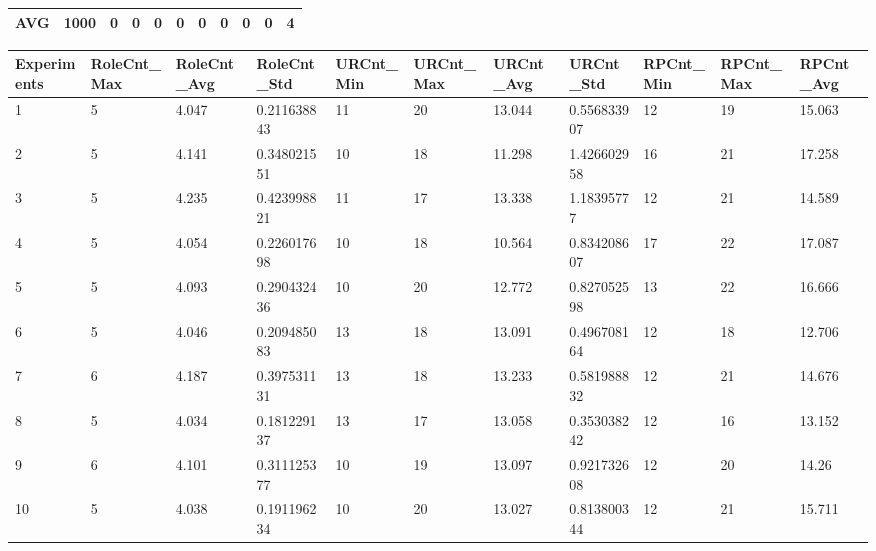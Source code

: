 \begin{table}[H]
\begin{adjustbox}{max width=380pt,keepaspectratio,angle=90}
\begin{tabular}{|l|l|l|l|l|l|l|l|l|l|l|}
					AVG         & 1000  & 0         & 0         & 0         & 0         & 0         & 0         & 0         & 0         & 4            \\ \hline
				\end{tabular}
			\end{adjustbox}
			\begin{adjustbox}{max width=380pt,keepaspectratio,angle=90}
				\begin{tabular}{|l|l|l|l|l|l|l|l|l|l|l|}
					\hline
					\rowcolor[HTML]{EFEFEF} 
					Experiments & RoleCnt\_Max & RoleCnt\_Avg & RoleCnt\_Std & URCnt\_Min & URCnt\_Max & URCnt\_Avg & URCnt\_Std  & RPCnt\_Min & RPCnt\_Max & RPCnt\_Avg \\ \hline
					1           & 5            & 4.047        & 0.211638843  & 11         & 20         & 13.044     & 0.556833907 & 12         & 19         & 15.063     \\ \hline
					2           & 5            & 4.141        & 0.348021551  & 10         & 18         & 11.298     & 1.426602958 & 16         & 21         & 17.258     \\ \hline
					3           & 5            & 4.235        & 0.423998821  & 11         & 17         & 13.338     & 1.18395777  & 12         & 21         & 14.589     \\ \hline
					4           & 5            & 4.054        & 0.226017698  & 10         & 18         & 10.564     & 0.834208607 & 17         & 22         & 17.087     \\ \hline
					5           & 5            & 4.093        & 0.290432436  & 10         & 20         & 12.772     & 0.827052598 & 13         & 22         & 16.666     \\ \hline
					6           & 5            & 4.046        & 0.209485083  & 13         & 18         & 13.091     & 0.496708164 & 12         & 18         & 12.706     \\ \hline
					7           & 6            & 4.187        & 0.397531131  & 13         & 18         & 13.233     & 0.581988832 & 12         & 21         & 14.676     \\ \hline
					8           & 5            & 4.034        & 0.181229137  & 13         & 17         & 13.058     & 0.353038242 & 12         & 16         & 13.152     \\ \hline
					9           & 6            & 4.101        & 0.311125377  & 10         & 19         & 13.097     & 0.921732608 & 12         & 20         & 14.26      \\ \hline
					10          & 5            & 4.038        & 0.191196234  & 10         & 20         & 13.027     & 0.813800344 & 12         & 21         & 15.711     \\ \hline

\end{tabular}
\end{adjustbox}
\end{table}
